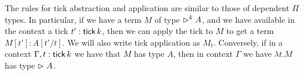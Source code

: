 
The rules for tick abstraction and application are similar to those of dependent
$\Pi$ types. 
In particular, if we have a term $M$ of type $\vartriangleright^k A$, and we
have available in the context a tick $t' : \mathsf{tick}\, k$, then we can apply the tick to $M$ to get
a term $M[t'] : A[t'/t]$. We will also write tick application as $M_t$.
Conversely, if in a context $\Gamma, t : \mathsf{tick}\, k$ we have that $M$ has type $A$,
then in context $\Gamma$ we have $\lambda t.M$ has type $\vartriangleright A$. %



